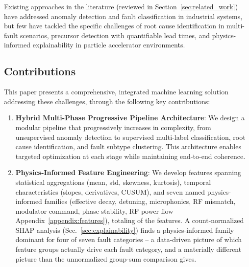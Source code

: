 Existing approaches in the literature (reviewed in Section~\ref{sec:related_work}) have addressed anomaly detection and fault classification in industrial systems, but few have tackled the specific challenges of root cause identification in multi-fault scenarios, precursor detection with quantifiable lead times, and physics-informed explainability in particle accelerator environments.

\subsection{Contributions}

This paper presents a comprehensive, integrated machine learning solution addressing these challenges, through the following key contributions:

\begin{enumerate}
    \item \textbf{Hybrid Multi-Phase Progressive Pipeline Architecture}: We design a modular pipeline that progressively increases in complexity, from unsupervised anomaly detection to supervised multi-label classification, root cause identification, and fault subtype clustering. This architecture enables targeted optimization at each stage while maintaining end-to-end coherence.

    \item \textbf{Physics-Informed Feature Engineering}: We develop \MetricZeroSixBinaryClassificationNFeatures{} features spanning statistical aggregations (mean, std, skewness, kurtosis), temporal characteristics (slopes, derivatives, CUSUM), and seven named physics-informed families (effective decay, detuning, microphonics, RF mismatch, modulator command, phase stability, RF power flow -- Appendix~\ref{appendix:features}), totaling \MetricOneZeroPhysicsGroupShapNFeaturesPhysicsInformedTotal{} of the \MetricZeroSixBinaryClassificationNFeatures{} features. %
A count-normalized SHAP analysis (Sec.~\ref{sec:explainability}) finds a physics-informed family dominant for four of seven fault categories -- a data-driven picture of which feature groups actually drive each fault category, and a materially different picture than the unnormalized group-sum comparison gives.


\end{enumerate}
